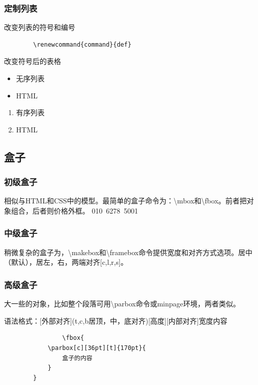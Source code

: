 \documentclass[16pt]{article}
\begin{document}
\subsubsection{定制列表}
改变列表的符号和编号
\begin{lstlisting}
        \renewcommand{command}{def}
    \end{lstlisting}
改变符号后的表格
\begin{itemize}
    \item 无序列表
    \item HTML
\end{itemize}
\begin{enumerate}
    \item 有序列表
    \item HTML
\end{enumerate}

\subsection{盒子}
\subsubsection{初级盒子}
相似与HTML和CSS中的模型。最简单的盒子命令为：\textbackslash mbox和\textbackslash fbox。前者把对象组合，后者则价格外框。
\mbox{010 6278 5001}
\subsubsection{中级盒子}
稍微复杂的盒子为，\textbackslash makebox和\textbackslash framebox命令提供宽度和对齐方式选项。居中（默认），居左，右，两端对齐[c,l,r,s]。\par
{} \par
{}
\subsubsection{高级盒子}
大一些的对象，比如整个段落可用\textbackslash parbox命令或minpage环境，两者类似。 \par
语法格式：[外部对齐](t,c,b居顶，中，底对齐)[高度][内部对齐]{宽度}{内容} \par
{}
\par
{}
\begin{lstlisting}
                \fbox{
            \parbox[c][36pt][t]{170pt}{
                盒子的内容
            }
        }
    \end{lstlisting}
\end{document}
